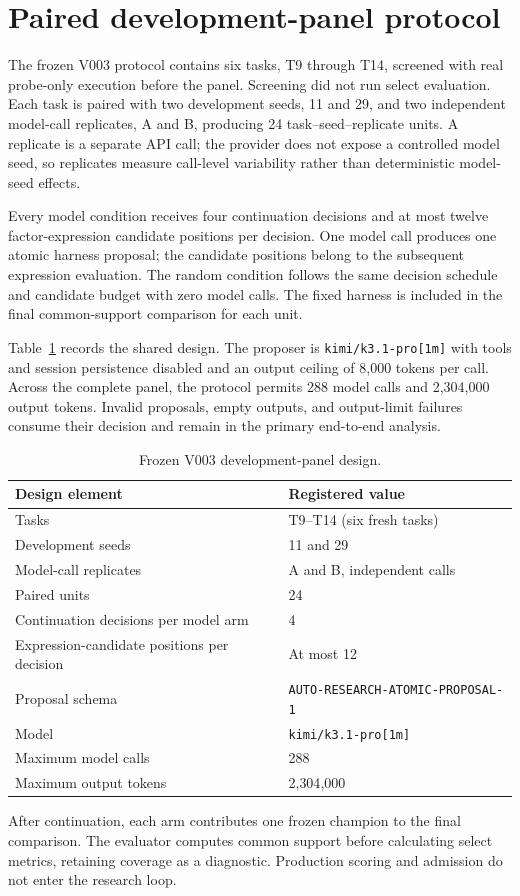\section{Paired development-panel protocol}
\label{sec:protocol}

The frozen V003 protocol contains six tasks, T9 through T14, screened with real probe-only execution before the panel. Screening did not run select evaluation. Each task is paired with two development seeds, 11 and 29, and two independent model-call replicates, A and B, producing 24 task--seed--replicate units. A replicate is a separate API call; the provider does not expose a controlled model seed, so replicates measure call-level variability rather than deterministic model-seed effects.

Every model condition receives four continuation decisions and at most twelve factor-expression candidate positions per decision. One model call produces one atomic harness proposal; the candidate positions belong to the subsequent expression evaluation. The random condition follows the same decision schedule and candidate budget with zero model calls. The fixed harness is included in the final common-support comparison for each unit.

Table~\ref{tab:protocol} records the shared design. The proposer is \texttt{kimi/k3.1-pro[1m]} with tools and session persistence disabled and an output ceiling of 8{,}000 tokens per call. Across the complete panel, the protocol permits 288 model calls and 2{,}304{,}000 output tokens. Invalid proposals, empty outputs, and output-limit failures consume their decision and remain in the primary end-to-end analysis.

\begin{table}[!htbp]
\caption{Frozen V003 development-panel design.}
\label{tab:protocol}
\centering
\ProjectCaption
\small
\begin{tabular}{ll}
\toprule
Design element & Registered value \\
\midrule
Tasks & T9--T14 (six fresh tasks) \\
Development seeds & 11 and 29 \\
Model-call replicates & A and B, independent calls \\
Paired units & 24 \\
Continuation decisions per model arm & 4 \\
Expression-candidate positions per decision & At most 12 \\
Proposal schema & \texttt{AUTO-RESEARCH-ATOMIC-PROPOSAL-1} \\
Model & \texttt{kimi/k3.1-pro[1m]} \\
Maximum model calls & 288 \\
Maximum output tokens & 2{,}304{,}000 \\
\bottomrule
\end{tabular}
\end{table}

After continuation, each arm contributes one frozen champion to the final comparison. The evaluator computes common support before calculating select metrics, retaining coverage as a diagnostic. Production scoring and admission do not enter the research loop.

